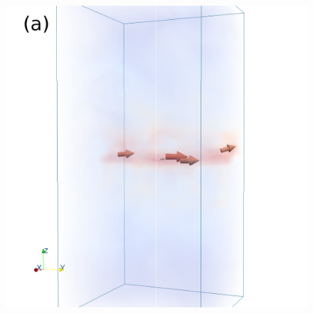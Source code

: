 \documentclass[useAMS,usenatbib]{mn2e}
\begin{document}
  \begin{figure}
  \centering
  \hspace{-3.5cm}
  \includegraphics[angle=0, trim=0.5cm 0cm 2cm 0cm, clip=true, totalheight=0.33\textheight]{fig/b310c.png}\hspace{-1.15cm}

\end{figure}
\end{document}
